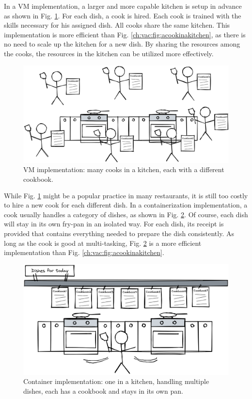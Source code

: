 In a VM implementation, a larger and more capable kitchen is setup in advance as shown in Fig. \ref{ch:vac:fig:manycooksinakitchen}. For each dish, a cook is hired. Each cook is trained with the skills necessary for his assigned dish. All cooks share the same kitchen. This implementation is more efficient than Fig. \ref{ch:vac:fig:acookinakitchen}, as there is no need to scale up the kitchen for a new dish. By sharing the resources among the cooks, the resources in the kitchen can be utilized more effectively.
\begin{figure}
	\centering \includegraphics[width=350pt]{chapters/ch-virtualization-and-containerization/figures/manycooksinakitchen.png}
	\caption{VM implementation: many cooks in a kitchen, each with a different cookbook.} \label{ch:vac:fig:manycooksinakitchen}
\end{figure}

While Fig. \ref{ch:vac:fig:manycooksinakitchen} might be a popular practice in many restaurants, it is still too costly to hire a new cook for each different dish. In a containerization implementation, a cook usually handles a category of dishes, as shown in Fig. \ref{ch:vac:fig:multitaskcook}. Of course, each dish will stay in its own fry-pan in an isolated way. For each dish, its receipt is provided that contains everything needed to prepare the dish consistently. As long as the cook is good at multi-tasking, Fig. \ref{ch:vac:fig:multitaskcook} is a more efficient implementation than Fig. \ref{ch:vac:fig:acookinakitchen}.

\begin{figure}
	\centering
	\includegraphics[width=350pt]{chapters/ch-virtualization-and-containerization/figures/multitaskcook.png}
	\caption{Container implementation: one in a kitchen, handling multiple dishes, each has a cookbook and stays in its own pan.} \label{ch:vac:fig:multitaskcook}
\end{figure}

